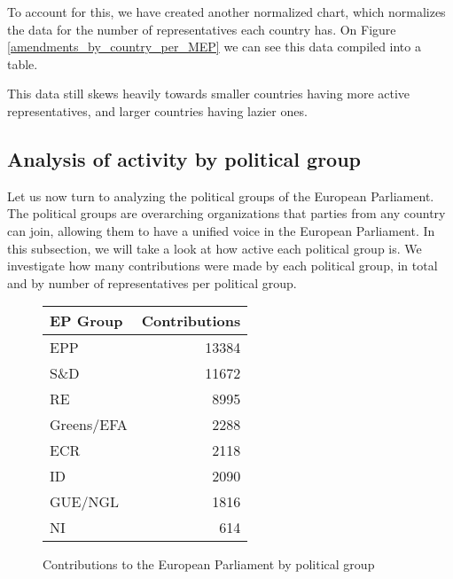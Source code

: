 \documentclass[lettersize,journal]{IEEEtran}
\begin{document}
To account for this, we have created another normalized chart, which normalizes the data for the number of representatives each country has. On Figure \ref{amendments_by_country_per_MEP} we can see this data compiled into a table.

This data still skews heavily towards smaller countries having more active representatives, and larger countries having lazier ones.

\subsection{Analysis of activity by political group} \label{epgroupactivity}

Let us now turn to analyzing the political groups of the European Parliament. The political groups are overarching organizations that parties from any country can join, allowing them to have a unified voice in the European Parliament. In this subsection, we will take a look at how active each political group is. We investigate how many contributions were made by each political group, in total and by number of representatives per political group.


\begin{figure}[h]
	\begin{center}
		\begin{tabular}{| l | r |}
			\hline
			EP Group & Contributions\\
			\hline
			EPP & 13384 \\
			S\&D & 11672 \\
			RE & 8995 \\
			Greens/EFA & 2288 \\
			ECR & 2118 \\
			ID & 2090 \\
			GUE/NGL & 1816 \\
			NI & 614 \\
			\hline
		\end{tabular}
		\caption{Contributions to the European Parliament by political group}
		\label{epgroup_contributions}
	\end{center}
\end{figure}
\end{document}
